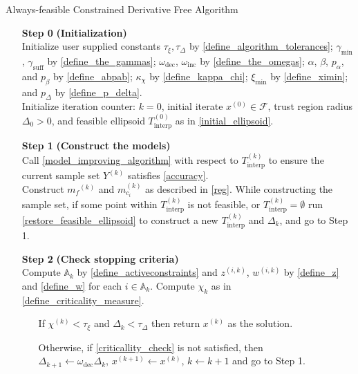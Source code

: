 \documentclass{article}
\theoremstyle{case}
\numberwithin{theorem}{subsection}
\newcommand{\activeconstraintsk}{{\mathbb A_{k}}}
\newcommand{\chik}{{\chi^{(k)}}}
\newcommand{\dk}{\Delta_k}
\newcommand{\feasible}{{\mathcal F}}
\newcommand{\gammabi}{\gamma_{\textrm{suff}}}
\newcommand{\gammasm}{\gamma_{\textrm{min}}}
\newcommand{\mcik}{{{m}^{(k)}_{c_i}}}
\newcommand{\mfk}{{{m}_f}^{(k)}}
\newcommand{\omegadec}{\omega_{\text{dec}}}
\newcommand{\omegainc}{\omega_{\text{inc}}}
\newcommand{\sampletrk}{{T_{\text{interp}}^{(k)}}}
\newcommand{\tolcrit}{\tau_{\xi}}
\newcommand{\tolrad}{\tau_{\Delta}}
\newcommand{\wik}{{w^{(i, k)}}}
\newcommand{\ximin}{\xi_{\text{min}}}
\newcommand{\xk}{x^{(k)}}
\newcommand{\xinit}{{x^{(0)}}}
\newcommand{\zik}{{z^{(i, k)}}}
\begin{document}
\begin{algorithm}[H]
    \caption{Always-feasible Constrained Derivative Free Algorithm}	
    \label{constrained_dfo}
    \begin{itemize}
        \item[\textbf{Step 0}] \textbf{(Initialization)} \\
        	Initialize user supplied constants $\tolcrit, \tolrad$ by \cref{define_algorithm_tolerances};
        	$\gammasm$, $\gammabi$ by \cref{define_the_gammas};
        	$\omegadec$, $\omegainc$ by \cref{define_the_omegas};
        	$\alpha$, $\beta$, $p_{\alpha}$, and $p_{\beta}$ by \cref{define_abpab};
			$\kappa_{\chi}$ by \cref{define_kappa_chi};
			$\ximin$ by \cref{define_ximin};
			and $p_{\Delta}$ by \cref{define_p_delta}. \\
        	Initialize iteration counter: $k=0$, initial iterate $\xinit \in \feasible$, trust region radius $\Delta_0 > 0$, and feasible ellipsoid $T^{(0)}_{\textrm{interp}}$ as in \cref{initial_ellipsoid}.
            
        \item[\textbf{Step 1}] \textbf{(Construct the models)} \\
        Call \cref{model_improving_algorithm} with respect to $\sampletrk$ to ensure the current sample set $Y^{(k)}$ satisfies \cref{accuracy}. \\
        Construct $\mfk$ and $\mcik$ as described in \cref{reg}.
        While constructing the sample set, if some point within $\sampletrk$ is not feasible, or $\sampletrk = \emptyset$ 
        run \cref{restore_feasible_ellipsoid} to construct a new $\sampletrk$ and $\dk$, and go to Step 1.
        
        \item[\textbf{Step 2}] \textbf{(Check stopping criteria)} \\
        	Compute $\activeconstraintsk$ by \cref{define_activeconstraints} and $\zik$, $\wik$ by \cref{define_z} and \cref{define_w} for each $i \in \activeconstraintsk$.
            Compute $\chi_k$ as in \cref{define_criticality_measure}. \begin{itemize}
                \item[] If $ \chik < \tau_{\xi} $ and $\dk <\tau_{\Delta}$ then return $\xk$ as the solution.
                \item[] Otherwise, if \cref{criticallity_check} is not satisfied, then \\
                $\Delta_{k+1} \gets \omegadec\dk$, 
                $x^{(k+1)} \gets \xk$,
                $k \gets k+1$ and go to Step 1.
            \end{itemize}
            

\end{itemize}
\end{algorithm}
\end{document}
